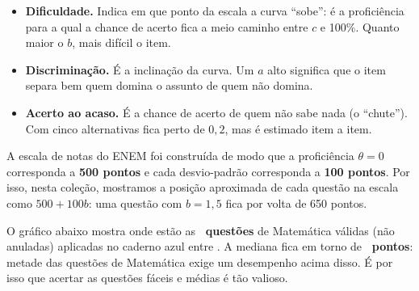 \begin{definicao}
\begin{itemize}[leftmargin=1.2em,itemsep=2pt,topsep=2pt]
  \item[$b$] \textbf{Dificuldade.} Indica em que ponto da escala a curva “sobe”: é a proficiência
        para a qual a chance de acerto fica a meio caminho entre $c$ e 100\%. Quanto maior o $b$,
        mais difícil o item.
  \item[$a$] \textbf{Discriminação.} É a inclinação da curva. Um $a$ alto significa que o item separa
        bem quem domina o assunto de quem não domina.
  \item[$c$] \textbf{Acerto ao acaso.} É a chance de acerto de quem não sabe nada (o “chute”).
        Com cinco alternativas fica perto de $0{,}2$, mas é estimado item a item.
\end{itemize}
\end{definicao}


A escala de notas do ENEM foi construída de modo que a proficiência $\theta = 0$ corresponda a
\textbf{500 pontos} e cada desvio-padrão corresponda a \textbf{100 pontos}. Por isso, nesta coleção,
mostramos a posição aproximada de cada questão na escala como $500 + 100b$: uma questão com
$b = 1{,}5$ fica por volta de 650 pontos.

O gráfico abaixo mostra onde estão as \textbf{\totalbanco\ questões} de Matemática válidas
(não anuladas) aplicadas no caderno azul entre \anosbanco. A mediana fica em torno de
\textbf{\trimediana\ pontos}: metade das questões de Matemática exige um desempenho acima
disso. É por isso que acertar as questões fáceis e médias é tão valioso.

\begin{center}
\end{center}

